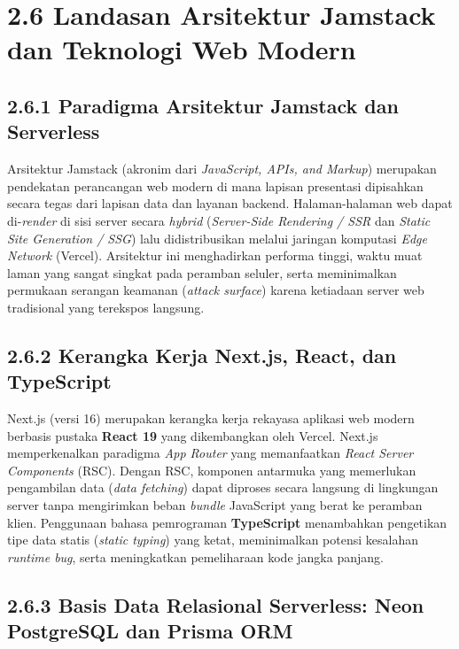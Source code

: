 \documentclass[
  indonesian,
  12pt,
]{report}
\begin{document}
\section{2.6 Landasan Arsitektur Jamstack dan Teknologi Web
Modern}\label{landasan-arsitektur-jamstack-dan-teknologi-web-modern}

\subsection{2.6.1 Paradigma Arsitektur Jamstack dan
Serverless}\label{paradigma-arsitektur-jamstack-dan-serverless}

Arsitektur Jamstack (akronim dari \emph{JavaScript, APIs, and Markup})
merupakan pendekatan perancangan web modern di mana lapisan presentasi
dipisahkan secara tegas dari lapisan data dan layanan backend.
Halaman-halaman web dapat di-\emph{render} di sisi server secara
\emph{hybrid} (\emph{Server-Side Rendering / SSR} dan \emph{Static Site
Generation / SSG}) lalu didistribusikan melalui jaringan komputasi
\emph{Edge Network} (Vercel). Arsitektur ini menghadirkan performa
tinggi, waktu muat laman yang sangat singkat pada peramban seluler,
serta meminimalkan permukaan serangan keamanan (\emph{attack surface})
karena ketiadaan server web tradisional yang terekspos langsung.

\subsection{2.6.2 Kerangka Kerja Next.js, React, dan
TypeScript}\label{kerangka-kerja-next.js-react-dan-typescript}

Next.js (versi 16) merupakan kerangka kerja rekayasa aplikasi web modern
berbasis pustaka \textbf{React 19} yang dikembangkan oleh Vercel.
Next.js memperkenalkan paradigma \emph{App Router} yang memanfaatkan
\emph{React Server Components} (RSC). Dengan RSC, komponen antarmuka
yang memerlukan pengambilan data (\emph{data fetching}) dapat diproses
secara langsung di lingkungan server tanpa mengirimkan beban
\emph{bundle} JavaScript yang berat ke peramban klien. Penggunaan bahasa
pemrograman \textbf{TypeScript} menambahkan pengetikan tipe data statis
(\emph{static typing}) yang ketat, meminimalkan potensi kesalahan
\emph{runtime bug}, serta meningkatkan pemeliharaan kode jangka panjang.

\subsection{2.6.3 Basis Data Relasional Serverless: Neon PostgreSQL dan
Prisma
ORM}\label{basis-data-relasional-serverless-neon-postgresql-dan-prisma-orm}
\end{document}
